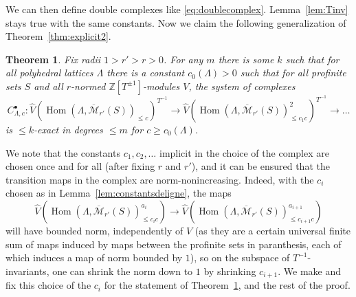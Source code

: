 \documentclass[11pt]{amsbook}
\DeclareMathOperator{\Hom}{Hom}
\numberwithin{equation}{section}
\newtheorem{theorem}{Theorem}
\numberwithin{theorem}{section}
\theoremstyle{definition}
\begin{document}
We can then define double complexes like \eqref{eq:doublecomplex}. Lemma~\ref{lem:Tinv} stays true with the same constants. Now we claim the following generalization of Theorem~\ref{thm:explicit2}.

\begin{theorem}\label{thm:explicit3} Fix radii $1>r'>r>0$. For any $m$ there is some $k$ such that for all polyhedral lattices $\Lambda$ there is a constant $c_0(\Lambda)>0$ such that for all profinite sets $S$ and all $r$-normed $\mathbb Z[T^{\pm 1}]$-modules $V$, the system of complexes
\[
C_{\Lambda,c}^\bullet: \widehat{V}(\Hom(\Lambda,\overline{\mathcal M}_{r'}(S))_{\leq c})^{T^{-1}}\to \widehat{V}(\Hom(\Lambda,\overline{\mathcal M}_{r'}(S))_{\leq c_1c}^2)^{T^{-1}}\to \ldots
\]
is $\leq k$-exact in degrees $\leq m$ for $c\geq c_0(\Lambda)$.
\end{theorem}

We note that the constants $c_1,c_2,\ldots$ implicit in the choice of the complex are chosen once and for all (after fixing $r$ and $r'$), and it can be ensured that the transition maps in the complex are norm-nonincreasing. Indeed, with the $c_i$ chosen as in Lemma~\ref{lem:constantsdeligne}, the maps
\[
\widehat{V}(\Hom(\Lambda,\overline{\mathcal M}_{r'}(S))_{\leq c_ic}^{a_i})\to \widehat{V}(\Hom(\Lambda,\overline{\mathcal M}_{r'}(S))_{\leq c_{i+1}c}^{a_{i+1}})
\]
will have bounded norm, independently of $V$ (as they are a certain universal finite sum of maps induced by maps between the profinite sets in paranthesis, each of which induces a map of norm bounded by $1$), so on the subspace of $T^{-1}$-invariants, one can shrink the norm down to $1$ by shrinking $c_{i+1}$. We make and fix this choice of the $c_i$ for the statement of Theorem~\ref{thm:explicit3}, and the rest of the proof.
\end{document}
